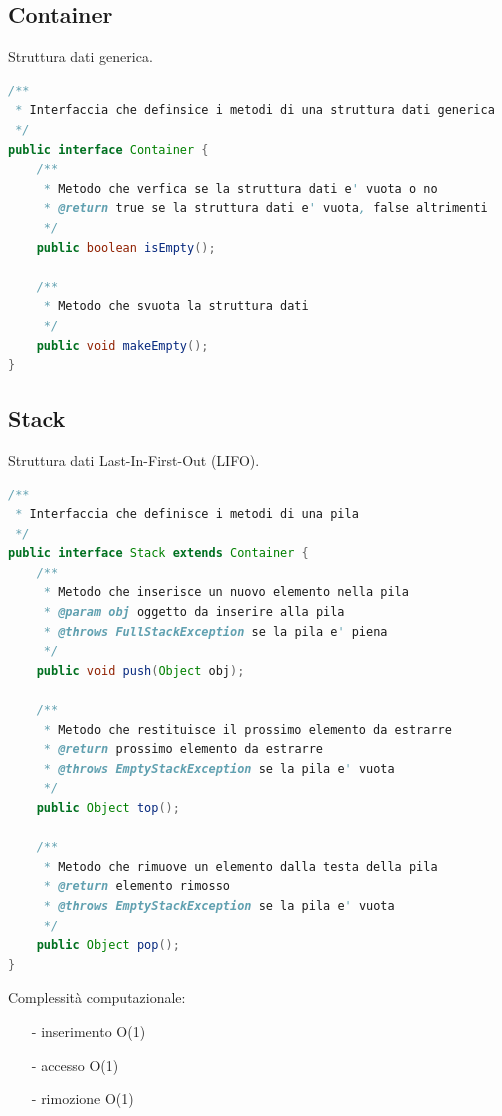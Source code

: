 \documentclass{article}
\begin{document}
\subsection{Container}
Struttura dati generica.
\begin{lstlisting}[language=Java]
/**
 * Interfaccia che definsice i metodi di una struttura dati generica
 */
public interface Container {
	/**
	 * Metodo che verfica se la struttura dati e' vuota o no
	 * @return true se la struttura dati e' vuota, false altrimenti
	 */
	public boolean isEmpty();

	/**
	 * Metodo che svuota la struttura dati
	 */
	public void makeEmpty();
}
\end{lstlisting}


\subsection{Stack}
Struttura dati Last-In-First-Out (LIFO).

\begin{lstlisting}[language=Java]
/**
 * Interfaccia che definisce i metodi di una pila
 */
public interface Stack extends Container {
	/**
	 * Metodo che inserisce un nuovo elemento nella pila
	 * @param obj oggetto da inserire alla pila
	 * @throws FullStackException se la pila e' piena
	 */
	public void push(Object obj);

	/**
	 * Metodo che restituisce il prossimo elemento da estrarre
	 * @return prossimo elemento da estrarre
	 * @throws EmptyStackException se la pila e' vuota
	 */
	public Object top();
	
	/**
	 * Metodo che rimuove un elemento dalla testa della pila
	 * @return elemento rimosso
	 * @throws EmptyStackException se la pila e' vuota
	 */
	public Object pop();
}
\end{lstlisting}

Complessità computazionale:
\begin{itemize} [topsep=3pt, itemsep=0pt]
	\item[-] inserimento O(1)
	\item[-] accesso O(1)
	\item[-] rimozione O(1)
\end{itemize}

\newpage
\end{document}
